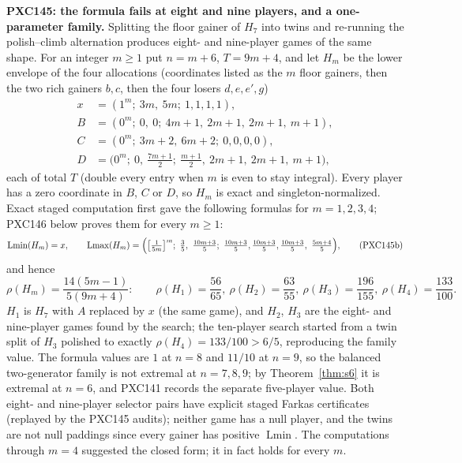 \documentclass[11pt]{article}
\newcommand{\Lmin}{\operatorname{Lmin}}
\newcommand{\Lmax}{\operatorname{Lmax}}
\begin{document}
\medskip
\noindent\textbf{PXC145: the formula fails at eight and nine players, and a
one-parameter family.}
Splitting the floor gainer of \(H_7\) into twins and re-running the
polish--climb alternation produces eight- and nine-player games of the same
shape.  For an integer \(m\ge1\) put \(n=m+6\), \(T=9m+4\), and let \(H_m\)
be the lower envelope of the four allocations (coordinates listed as the
\(m\) floor gainers, then the two rich gainers \(b,c\), then the four losers
\(d,e,e',g\))
\[
\begin{aligned}
 x&=(1^{m};\ 3m,\ 5m;\ 1,1,1,1),\\
 B&=(0^{m};\ 0,\ 0;\ 4m+1,\ 2m+1,\ 2m+1,\ m+1),\\
 C&=(0^{m};\ 3m+2,\ 6m+2;\ 0,0,0,0),\\
 D&=\bigl(0^{m};\ 0,\ \tfrac{7m+1}{2};\ \tfrac{m+1}{2},\ 2m+1,\ 2m+1,\ m+1\bigr),
\end{aligned}                                                 \tag{PXC145a}
\]
each of total \(T\) (double every entry when \(m\) is even to stay
integral).  Every player has a zero coordinate in \(B\), \(C\) or \(D\), so
\(H_m\) is exact and singleton-normalized.  Exact staged computation first
gave the following formulas for \(m=1,2,3,4\); PXC146 below proves them for
every \(m\ge1\):
\begin{equation}
 \Lmin(H_m)=x,\qquad
 \Lmax(H_m)=\Bigl(\bigl[\tfrac1{5m}\bigr]^{m};\ \tfrac35,\ \tfrac{10m+3}5;\
 \tfrac{10m+3}5,\tfrac{10m+3}5,\tfrac{10m+3}5,\ \tfrac{5m+4}5\Bigr),      \tag{PXC145b}
\end{equation}
and hence
\begin{equation}
 \rho(H_m)=\frac{14(5m-1)}{5(9m+4)}:\qquad
 \rho(H_1)=\frac{56}{65},\ \rho(H_2)=\frac{63}{55},\
 \rho(H_3)=\frac{196}{155},\ \rho(H_4)=\frac{133}{100}.       \tag{PXC145c}
\end{equation}
\(H_1\) is \(H_7\) with \(A\) replaced by \(x\) (the same game), and
\(H_2\), \(H_3\) are the eight- and nine-player games found by the search;
the ten-player search started from a twin split of \(H_3\) polished to
exactly \(\rho(H_4)=133/100>6/5\), reproducing the family value.
The formula values are \(1\) at \(n=8\) and \(11/10\) at \(n=9\), so the
balanced two-generator family is not extremal at \(n=7,8,9\); by
Theorem~\ref{thm:s6} it is extremal at \(n=6\), and PXC141 records the
separate five-player value.  Both eight- and nine-player selector pairs
have explicit staged Farkas certificates (replayed by the PXC145 audits);
neither game has a null player, and the twins are not null paddings since
every gainer has positive \(\Lmin\).  The computations through \(m=4\)
suggested the closed form; it in fact holds for every \(m\).
\end{document}
